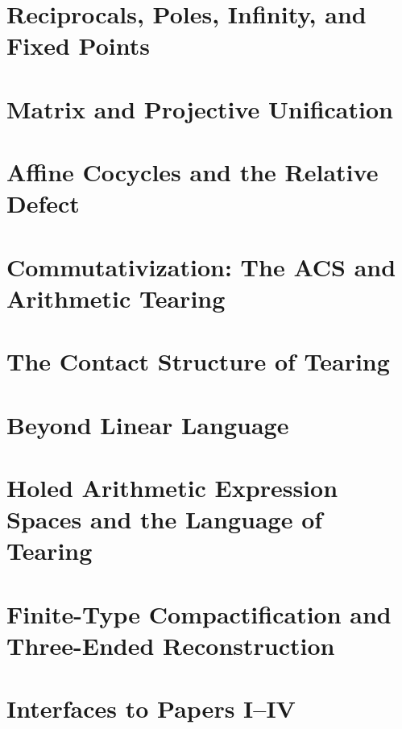 \documentclass[11pt]{article}
\theoremstyle{definition}
\theoremstyle{remark}
\begin{document}
\section{Reciprocals, Poles, Infinity, and Fixed Points}\label{sec:p0-reciprocals}


\section{Matrix and Projective Unification}\label{sec:p0-projective-unification}


\section{Affine Cocycles and the Relative Defect}\label{sec:p0-affine-cocycles}


\section{Commutativization: The ACS and Arithmetic Tearing}\label{sec:p0-acs-tearing}


\section{The Contact Structure of Tearing}\label{sec:p0-contact}


\section{Beyond Linear Language}\label{sec:p0-beyond-linear}


\section{Holed Arithmetic Expression Spaces and the Language of Tearing}\label{sec:p0-holed}


\section{Finite-Type Compactification and Three-Ended Reconstruction}\label{sec:p0-compactification}


\section{Interfaces to Papers I--IV}\label{sec:p0-interface}

\end{document}
